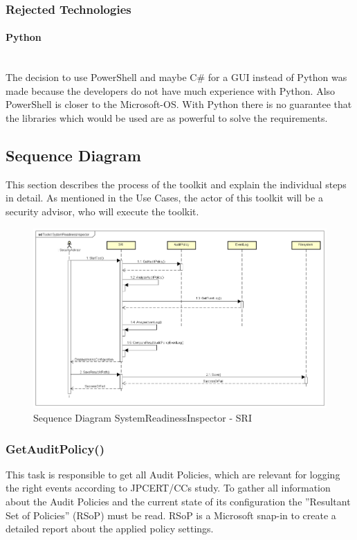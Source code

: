 \subsubsection{Rejected Technologies}

\paragraph{Python}\ \\
The decision to use PowerShell and maybe C\# for a GUI instead of Python was made because the developers do not have much experience with Python. Also PowerShell is closer to the Microsoft-OS. With Python there is no guarantee that the libraries which would be used are as powerful to solve the requirements.


\clearpage

\subsection{Sequence Diagram}
This section describes the process of the toolkit and explain the individual steps in detail. As mentioned in the Use Cases, the actor of this toolkit will be a security advisor, who will execute the toolkit.

\begin{figure}[H]
    \centering
    \includegraphics[width=0.8\linewidth]{assets/design-tool/SequenceDiagramSRI.png}
    \caption{Sequence Diagram SystemReadinessInspector - SRI}
\end{figure}

\subsubsection{GetAuditPolicy()}
This task is responsible to get all Audit Policies, which are relevant for logging the right events according to JPCERT/CCs study. To gather all information about the Audit Policies and the current state of its configuration  the ''Resultant Set of Policies'' (RSoP) must be read. \cite{RSoP} RSoP is a Microsoft snap-in to create a detailed report about the applied policy settings. 

